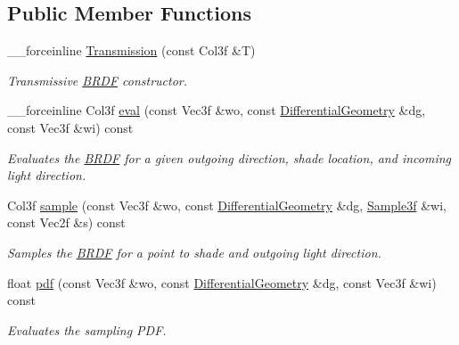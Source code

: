 \subsection*{Public Member Functions}
\begin{DoxyCompactItemize}
\item 
\_\-\_\-forceinline \hyperlink{classembree_1_1_transmission_a834db24f3883ab5c808aeb0bd98e4ad0}{Transmission} (const Col3f \&T)
\begin{DoxyCompactList}\small\item\em Transmissive \hyperlink{classembree_1_1_b_r_d_f}{BRDF} constructor. \item\end{DoxyCompactList}\item 
\_\-\_\-forceinline Col3f \hyperlink{classembree_1_1_transmission_a2b7f2db78edbb393103bc1f2605c2aa4}{eval} (const Vec3f \&wo, const \hyperlink{structembree_1_1_differential_geometry}{DifferentialGeometry} \&dg, const Vec3f \&wi) const 
\begin{DoxyCompactList}\small\item\em Evaluates the \hyperlink{classembree_1_1_b_r_d_f}{BRDF} for a given outgoing direction, shade location, and incoming light direction. \item\end{DoxyCompactList}\item 
Col3f \hyperlink{classembree_1_1_transmission_aa22d7761c728167e6aa009dde0bd6f53}{sample} (const Vec3f \&wo, const \hyperlink{structembree_1_1_differential_geometry}{DifferentialGeometry} \&dg, \hyperlink{structembree_1_1_sample}{Sample3f} \&wi, const Vec2f \&s) const 
\begin{DoxyCompactList}\small\item\em Samples the \hyperlink{classembree_1_1_b_r_d_f}{BRDF} for a point to shade and outgoing light direction. \item\end{DoxyCompactList}\item 
float \hyperlink{classembree_1_1_transmission_a5d6c2a769d14d6d598f6d7315e1bcb52}{pdf} (const Vec3f \&wo, const \hyperlink{structembree_1_1_differential_geometry}{DifferentialGeometry} \&dg, const Vec3f \&wi) const 
\begin{DoxyCompactList}\small\item\em Evaluates the sampling PDF. \item\end{DoxyCompactList}\end{DoxyCompactItemize}


